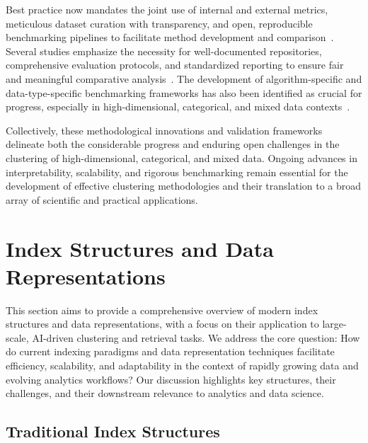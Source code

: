 \documentclass[sigconf]{acmart}
\begin{document}
Best practice now mandates the joint use of internal and external metrics, meticulous dataset curation with transparency, and open, reproducible benchmarking pipelines to facilitate method development and comparison~\cite{ref22,ref46,ref74,ref90,ref96,ref97,ref100,ref113,ref116}. Several studies emphasize the necessity for well-documented repositories, comprehensive evaluation protocols, and standardized reporting to ensure fair and meaningful comparative analysis~\cite{ref14,ref67,ref74,ref113}. The development of algorithm-specific and data-type-specific benchmarking frameworks has also been identified as crucial for progress, especially in high-dimensional, categorical, and mixed data contexts~\cite{ref67,ref96,ref116}.

Collectively, these methodological innovations and validation frameworks delineate both the considerable progress and enduring open challenges in the clustering of high-dimensional, categorical, and mixed data. Ongoing advances in interpretability, scalability, and rigorous benchmarking remain essential for the development of effective clustering methodologies and their translation to a broad array of scientific and practical applications.

\section{Index Structures and Data Representations}

This section aims to provide a comprehensive overview of modern index structures and data representations, with a focus on their application to large-scale, AI-driven clustering and retrieval tasks. We address the core question: How do current indexing paradigms and data representation techniques facilitate efficiency, scalability, and adaptability in the context of rapidly growing data and evolving analytics workflows? Our discussion highlights key structures, their challenges, and their downstream relevance to analytics and data science.


\subsection{Traditional Index Structures}
\end{document}

